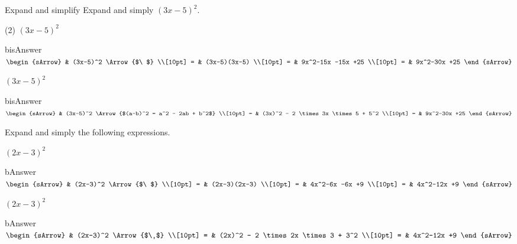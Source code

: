 \clearpage\noindent%
\begin{boxA}[styleTitleLeft]{Expand and simplify}    
    Expand and simply $(3x-5)^2$.
  \begin{mtask}(2)
      \task[] $(3x-5)^2$
              \begin{envOut}[equal height group=A-Rev-1]{bisAnswer}
			       $\begin{sArrow}
			             & (3x-5)^2         \Arrow{$\ $} \\[10pt]
                       = & (3x-5)(3x-5)                  \\[10pt]      
					   = & 9x^2-15x -15x +25             \\[10pt]
					   = & 9x^2-30x +25
	                \end{sArrow}$
              \end{envOut}
      \task[] $(3x-5)^2$
              \begin{envOut}[equal height group=A-Rev-1]{bisAnswer}
			       $\begin{sArrow}
			             & (3x-5)^2         \Arrow{$(a-b)^2 = a^2 - 2ab + b^2$}             \\[10pt]
                       = & (3x)^2 - 2 \times 3x \times 5 + 5^2       \\[10pt]      
					   = & 9x^2-30x  +25 
	                \end{sArrow}$
              \end{envOut}
  \end{mtask}
\end{boxA}

\clearpage
Expand and simply the following expressions.
\begin{mtask}
      \task[] $(2x-3)^2$
              \begin{envOut}[equal height group=A-Rev-1]{bAnswer}
			       $\begin{sArrow}
			             & (2x-3)^2         \Arrow{$\ $} \\[10pt]
                       = & (2x-3)(2x-3)                  \\[10pt]      
					   = & 4x^2-6x -6x +9                \\[10pt]
					   = & 4x^2-12x +9
	                \end{sArrow}$
              \end{envOut}
      \task[] $(2x-3)^2$
              \begin{envOut}[equal height group=A-Rev-1]{bAnswer}
			       $\begin{sArrow}
			             & (2x-3)^2         \Arrow{$\ $}        \\[10pt]
                       = & (2x)^2 - 2 \times 2x \times 3 + 3^2  \\[10pt]      
					   = & 4x^2-12x +9
	                \end{sArrow}$
              \end{envOut}
\end{mtask}


